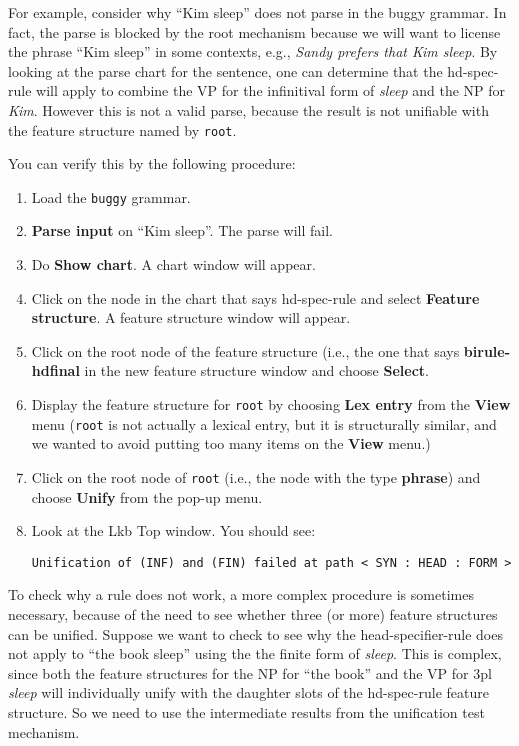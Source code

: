 \documentclass[12pt]{report}
\begin{document}
For example, consider why ``Kim sleep'' does not parse in the buggy
grammar.  
In fact, the parse is blocked by the root mechanism
because we will want to license the
phrase ``Kim sleep'' in some contexts, e.g., 
{\it Sandy prefers that Kim sleep}.
By looking at the 
parse chart for the sentence, one can determine that
the hd-spec-rule will apply to combine the VP for
the infinitival form of {\it sleep} and the NP for {\it Kim}.
However this is not a valid parse, because the result is not unifiable with the
feature structure named by {\tt root}.

You can verify this by the following procedure:
\begin{enumerate}
\item Load the {\tt buggy} grammar.
\item {\bf Parse input} on ``Kim sleep''.  The parse will fail.
\item Do {\bf Show chart}.  A chart window will appear.
\item Click on the node in the chart that says hd-spec-rule and 
select {\bf Feature structure}. A feature structure window will
appear.
\item 
Click on the root node of the feature structure (i.e., the one
that says {\bf birule-hdfinal} in the 
new feature structure
window and 
choose {\bf Select}.
\item Display the feature structure for {\tt root} by choosing
{\bf Lex entry} from the {\bf View} menu ({\tt root} is not actually a
lexical entry, but it is structurally similar, and we wanted to avoid putting
too many items on the {\bf View} menu.)
\item Click on the root node of {\tt root} (i.e., the node
with the type {\bf phrase}) and choose {\bf Unify} from the pop-up menu.
\item Look at the Lkb Top window.  You should see:
\begin{verbatim}
Unification of (INF) and (FIN) failed at path < SYN : HEAD : FORM >
\end{verbatim}
\end{enumerate}

To check why a rule does not work, a more complex
procedure is sometimes necessary, because of the need to see whether
three (or more) feature structures can be unified.  
Suppose we want to check to see why the head-specifier-rule
does not apply to ``the book sleep'' using the
the finite form of {\it sleep}. This is 
complex, since both the feature structures for the NP for ``the book'' and
the VP for 3pl {\it sleep} will individually unify with the
daughter slots of the hd-spec-rule feature structure.
So we need to use the intermediate results 
from the unification test mechanism.
\end{document}
